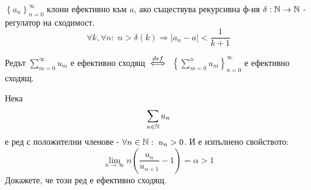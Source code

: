 \begin{definition}
    $\left\{a_n\right\}_{n=0}^\infty$ клони ефективно към $a$, ако съществува рекурсивна ф-ия $\delta : {\mathbb{N}} \to {\mathbb{N}}$ - регулатор на сходимост.
    \begin{equation*}
        \forall k, \forall n:\; n > \delta(k) \Rightarrow |a_n - a| < \frac{1}{k+1}
    \end{equation*}
\end{definition}

\begin{definition}
    Редът $\sum\limits_{m=0}^\infty u_m$ е ефективно сходящ ${\overset{def}{\iff}}$ $\left\{\sum\limits_{m=0}^n u_m\right\}_{n=0}^\infty$ е ефективно сходящ.
\end{definition}

\begin{problem}
    Нека 
    \begin{equation}
        \sum\limits_{n\in{\mathbb{N}}} u_n
    \end{equation}
    е ред с положителни членове - $\forall n\in{\mathbb{N}}:\; u_n > 0$. И е изпълнено свойството:
    \begin{equation}\label{eq:raabe-property}
        \lim\limits_{n\to\infty} n\left( \frac{u_n}{u_{n+1}} - 1 \right) = \alpha > 1
    \end{equation}
    Докажете, че този ред е ефективно сходящ.
\end{problem}

